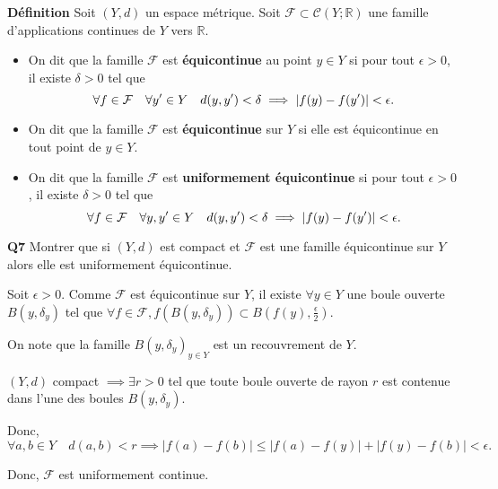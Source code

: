 \documentclass[french]{article}
\begin{document}
	\begin{tcolorbox}[colback=yellow!5!white,colframe=yellow!75!black]
		\textbf{\large{Définition}} Soit $(Y,d)$ un espace métrique. Soit $\mathcal{F} \subset \mathcal{C}(Y; \mathbb{R})$ une famille d'applications continues de $Y$ vers $\mathbb{R}$.
		\begin{itemize}
			\item On dit que la famille $\mathcal{F}$ est \textbf{équicontinue} au point $y \in Y$ si pour tout $\epsilon > 0$, il existe $\delta > 0$ tel que
			\[\forall f \in \mathcal{F} \quad \forall y\sp{\prime} \in Y \quad d(y,y\sp{\prime}) < \delta \implies |f(y) - f(y\sp{\prime})| < \epsilon.\]
			\item On dit que la famille $\mathcal{F}$ est \textbf{équicontinue} sur $Y$ si elle est équicontinue en tout point de $y \in Y$.
			\item On dit que la famille $\mathcal{F}$ est \textbf{uniformement équicontinue} si pour tout $\epsilon > 0$, il existe $\delta > 0$ tel que
				\[\forall f \in \mathcal{F} \quad \forall y,y\sp{\prime} \in Y \quad d(y,y\sp{\prime}) < \delta \implies |f(y) - f(y\sp{\prime})| < \epsilon.\]
		\end{itemize}
	\end{tcolorbox}

	\begin{tcolorbox}[colback=gray!5!white,colframe=gray!75!black]
		\textbf{\large{Q7}} Montrer que si $(Y,d)$ est compact et $\mathcal{F}$ est une famille équicontinue sur $Y$ alors elle est uniformement équicontinue.
	\end{tcolorbox}

	Soit $\epsilon > 0$. Comme $\mathcal{F}$ est équicontinue sur $Y$, il existe $\forall y \in Y$ une boule ouverte $B(y, \delta_y)$ tel que $\forall f \in \mathcal{F}, f(B(y, \delta_y)) \subset B(f(y), \frac{\epsilon}{2})$.
	
	On note que la famille $B(y, \delta_y)_{y \in Y}$ est un recouvrement de $Y$.
	
	$(Y,d)$ compact $\implies \exists r>0$ tel que toute boule ouverte de rayon $r$ est contenue dans l'une des boules $B(y, \delta_y)$.
	
	Donc,
	\[\forall a,b \in Y \quad d(a, b) < r \implies |f(a) - f(b)| \leq |f(a) - f(y)| + |f(y) - f(b)| < \epsilon. \]
	
	Donc, $\mathcal{F}$ est uniformement continue.
	

	\newpage
\end{document}
